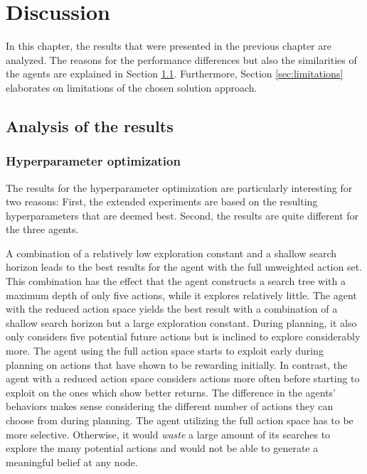 \chapter{Discussion}
\label{ch:discussion}

In this chapter, the results that were presented in the previous chapter are analyzed. The reasons for the performance differences but also the similarities of the agents are explained in Section \ref{sec:discussion_analysis}. Furthermore, Section \ref{sec:limitations} elaborates on limitations of the chosen solution approach.

\section{Analysis of the results}
\label{sec:discussion_analysis}

\subsection{Hyperparameter optimization}

The results for the hyperparameter optimization are particularly interesting for two reasons: First, the extended experiments are based on the resulting hyperparameters that are deemed best. Second, the results are quite different for the three agents. 

A combination of a relatively low exploration constant and a shallow search horizon leads to the best results for the agent with the full unweighted action set. This combination has the effect that the agent constructs a search tree with a maximum depth of only five actions, while it explores relatively little. The agent with the reduced action space yields the best result with a combination of a shallow search horizon but a large exploration constant. During planning, it also only considers five potential future actions but is inclined to explore considerably more. The agent using the full action space starts to exploit early during planning on actions that have shown to be rewarding initially. In contrast, the agent with a reduced action space considers actions more often before starting to exploit on the ones which show better returns. The difference in the agents' behaviors makes sense considering the different number of actions they can choose from during planning. The agent utilizing the full action space has to be more selective. Otherwise, it would \emph{waste} a large amount of its searches to explore the many potential actions and would not be able to generate a meaningful belief at any node.

